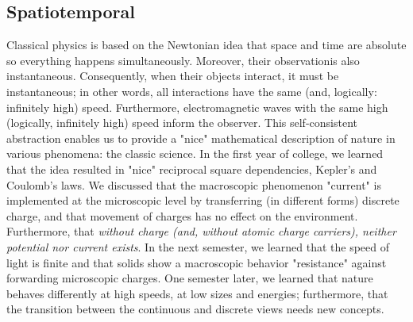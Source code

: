 
\subsection{Spatiotemporal\label{sec:Physics-Spatiotemporal}}


Classical physics is based on the Newtonian idea that  space and time are absolute so everything happens simultaneously. Moreover, their observationis also instantaneous. Consequently, when their objects
interact, it must be instantaneous; in other words,
all interactions have the same (and, logically: infinitely high) speed. Furthermore, electromagnetic
waves with the same high (logically, infinitely high) speed inform the observer. This
self-consistent abstraction enables us to provide a "nice"
mathematical description of nature in various phenomena: the classic
science. In the first year of college, we learned that the idea resulted
in "nice" reciprocal square dependencies, Kepler's and Coulomb's
laws. We discussed that the macroscopic phenomenon "current" is
implemented at the microscopic level by transferring (in different
forms) discrete charge, and that movement of charges has no effect on the environment. Furthermore, that \textit{without charge (and, without atomic charge carriers),
neither potential nor current exists}. In the next semester, we learned
that the speed of light is finite and that solids show a macroscopic
behavior "resistance" against forwarding microscopic charges.
One semester later, we learned that nature behaves differently
at high speeds, at low sizes and energies;
furthermore, that the transition between the continuous and discrete 
views needs new concepts.

